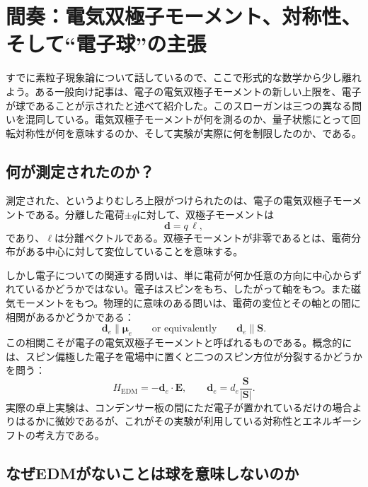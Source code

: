 \section{間奏：電気双極子モーメント、対称性、そして``電子球''の主張}

すでに素粒子現象論について話しているので、ここで形式的な数学から少し離れよう。ある一般向け記事は、電子の電気双極子モーメントの新しい上限を、電子が球であることが示されたと述べて紹介した。このスローガンは三つの異なる問いを混同している。電気双極子モーメントが何を測るのか、量子状態にとって回転対称性が何を意味するのか、そして実験が実際に何を制限したのか、である。

\subsection{何が測定されたのか？}

測定された、というよりむしろ上限がつけられたのは、電子の電気双極子モーメントである。分離した電荷\(\pm q\)に対して、双極子モーメントは
\begin{equation}
\mathbf d = q\,\boldsymbol{\ell},
\end{equation}
であり、\(\boldsymbol{\ell}\)は分離ベクトルである。双極子モーメントが非零であるとは、電荷分布がある中心に対して変位していることを意味する。

しかし電子についての関連する問いは、単に電荷が何か任意の方向に中心からずれているかどうかではない。電子はスピンをもち、したがって軸をもつ。また磁気モーメントをもつ。物理的に意味のある問いは、電荷の変位とその軸との間に相関があるかどうかである：
\begin{equation}
\mathbf d_e \parallel \boldsymbol{\mu}_e
\qquad \text{or equivalently} \qquad
\mathbf d_e \parallel \mathbf S .
\end{equation}
この相関こそが電子の電気双極子モーメントと呼ばれるものである。概念的には、スピン偏極した電子を電場中に置くと二つのスピン方位が分裂するかどうかを問う：
\begin{equation}
H_{\mathrm{EDM}}=-\mathbf d_e\cdot \mathbf E,
\qquad
\mathbf d_e=d_e\frac{\mathbf S}{|\mathbf S|}.
\end{equation}
実際の卓上実験は、コンデンサー板の間にただ電子が置かれているだけの場合よりはるかに微妙であるが、これがその実験が利用している対称性とエネルギーシフトの考え方である。

\subsection{なぜEDMがないことは球を意味しないのか}

